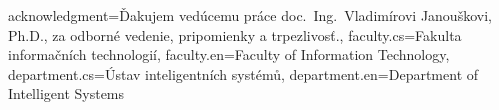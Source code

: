 {%
  acknowledgment={Ďakujem vedúcemu práce doc.\ Ing.\ Vladimírovi Janouškovi, Ph.D., za odborné vedenie, pripomienky a trpezlivosť.},
  faculty.cs={Fakulta informačních technologií}, %
  faculty.en={Faculty of Information Technology}, %
  department.cs={Ústav inteligentních systémů}, %
  department.en={Department of Intelligent Systems} %
}



